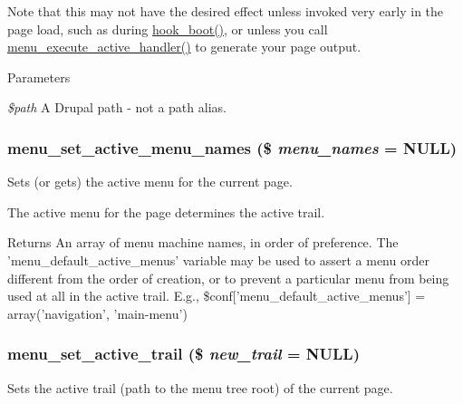 Note that this may not have the desired effect unless invoked very early in the page load, such as during \hyperlink{group__hooks_ga9ac1dfffdc69471a3d00d67503c71577}{hook\_\-boot()}, or unless you call \hyperlink{group__menu_gae33bae24fcac6126aa272d1c437f947c}{menu\_\-execute\_\-active\_\-handler()} to generate your page output.


\begin{DoxyParams}{Parameters}
\item[{\em \$path}]A Drupal path -\/ not a path alias. \end{DoxyParams}
\hypertarget{group__menu_gadf802fedf19e7b29e3970e936bae9bc0}{
\subsubsection[{menu\_\-set\_\-active\_\-menu\_\-names}]{\setlength{\rightskip}{0pt plus 5cm}menu\_\-set\_\-active\_\-menu\_\-names (\$ {\em menu\_\-names} = {\ttfamily NULL})}}
\label{group__menu_gadf802fedf19e7b29e3970e936bae9bc0}
Sets (or gets) the active menu for the current page.

The active menu for the page determines the active trail.

\begin{DoxyReturn}{Returns}
An array of menu machine names, in order of preference. The 'menu\_\-default\_\-active\_\-menus' variable may be used to assert a menu order different from the order of creation, or to prevent a particular menu from being used at all in the active trail. E.g., \$conf\mbox{[}'menu\_\-default\_\-active\_\-menus'\mbox{]} = array('navigation', 'main-\/menu') 
\end{DoxyReturn}
\hypertarget{group__menu_ga9328a9a4f297d8bb095d924e75a8abd7}{
\subsubsection[{menu\_\-set\_\-active\_\-trail}]{\setlength{\rightskip}{0pt plus 5cm}menu\_\-set\_\-active\_\-trail (\$ {\em new\_\-trail} = {\ttfamily NULL})}}
\label{group__menu_ga9328a9a4f297d8bb095d924e75a8abd7}
Sets the active trail (path to the menu tree root) of the current page.

